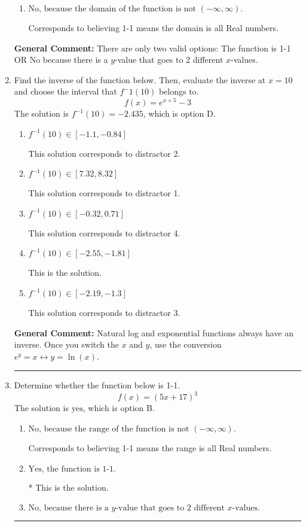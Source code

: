 \documentclass{extbook}[14pt]
\newcommand{\litem}[1]{\item #1

\rule{\textwidth}{0.4pt}}
\begin{document}
\begin{enumerate}
{\begin{enumerate}[label=\Alph*.]
* This is the solution.
\item \( \text{No, because the domain of the function is not $(-\infty, \infty)$.} \)

Corresponds to believing 1-1 means the domain is all Real numbers.
\end{enumerate}

\textbf{General Comment:} There are only two valid options: The function is 1-1 OR No because there is a $y$-value that goes to 2 different $x$-values.
}
\litem{
Find the inverse of the function below. Then, evaluate the inverse at $x = 10$ and choose the interval that $f^-1(10)$ belongs to.
\[ f(x) = e^{x+5}-3 \]The solution is \( f^{-1}(10) = -2.435 \), which is option D.\begin{enumerate}[label=\Alph*.]
\item \( f^{-1}(10) \in [-1.1, -0.84] \)

 This solution corresponds to distractor 2.
\item \( f^{-1}(10) \in [7.32, 8.32] \)

 This solution corresponds to distractor 1.
\item \( f^{-1}(10) \in [-0.32, 0.71] \)

 This solution corresponds to distractor 4.
\item \( f^{-1}(10) \in [-2.55, -1.81] \)

 This is the solution.
\item \( f^{-1}(10) \in [-2.19, -1.3] \)

 This solution corresponds to distractor 3.
\end{enumerate}

\textbf{General Comment:} Natural log and exponential functions always have an inverse. Once you switch the $x$ and $y$, use the conversion $ e^y = x \leftrightarrow y=\ln(x)$.
}
\litem{
Determine whether the function below is 1-1.
\[ f(x) = (5 x + 17)^3 \]The solution is \( \text{yes} \), which is option B.\begin{enumerate}[label=\Alph*.]
\item \( \text{No, because the range of the function is not $(-\infty, \infty)$.} \)

Corresponds to believing 1-1 means the range is all Real numbers.
\item \( \text{Yes, the function is 1-1.} \)

* This is the solution.
\item \( \text{No, because there is a $y$-value that goes to 2 different $x$-values.} \)


\end{enumerate}}
\end{enumerate}
\end{document}
